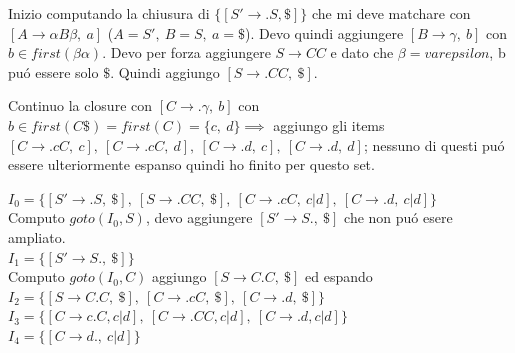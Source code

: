 Inizio computando la chiusura di $\{ [S' \rightarrow .S,\$ ] \}$ che mi deve matchare con $[A \rightarrow \alpha B \beta,\ a]$ 
($A = S',\ B = S,\ a = \$ $). Devo quindi aggiungere $[B \rightarrow \gamma ,\ b]$ con $b \in first(\beta\alpha)$.
Devo per forza aggiungere $S \rightarrow CC$ e dato che $\beta = varepsilon$, b pu\'o essere solo $\$$.
Quindi aggiungo $[S \rightarrow .CC,\ \$]$.

Continuo la closure con $[C \rightarrow .\gamma ,\ b]$ con $b \in first(C\$) = first(C) = \{ c,\ d \} \implies$ aggiungo gli items 
$[C \rightarrow .cC,\ c],\ [C \rightarrow .cC,\ d],\ [C \rightarrow .d,\ c],\ [C \rightarrow .d,\ d]$; nessuno di questi pu\'o essere 
ulteriormente espanso quindi ho finito per questo set.

$I_0 = \{  [S' \rightarrow .S,\ \$],\ [S \rightarrow .CC,\ \$],\ [C \rightarrow .cC,\ c|d],\ [C \rightarrow .d,\ c|d] \}$\\

Computo $goto(I_0, S)$, devo aggiungere $[S' \rightarrow S.,\ \$]$ che non pu\'o esere ampliato.\\

$I_1 = \{ [S' \rightarrow S.,\ \$] \}$\\

Computo $goto(I_0, C)$ aggiungo $[S \rightarrow C.C,\ \$ ]$ ed espando\\

$I_2 = \{ [S \rightarrow C.C,\ \$],\ [C \rightarrow .cC,\ \$],\ [C \rightarrow .d,\ \$] \}$\\
$I_3 = \{ [C \rightarrow c.C, c|d],\ [C \rightarrow .CC, c|d],\ [C \rightarrow .d, c|d] \}$\\
$I_4 = \{ [C \rightarrow d.,\ c|d] \}$\\

